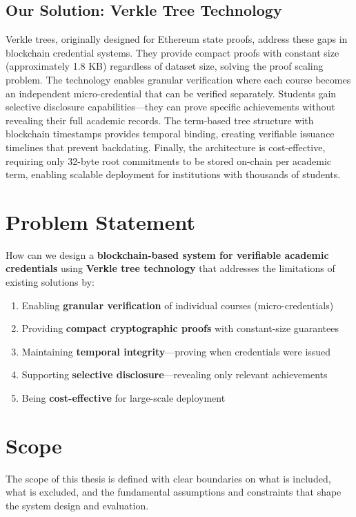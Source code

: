 \subsection{Our Solution: Verkle Tree Technology}
Verkle trees, originally designed for Ethereum state proofs, address these gaps in blockchain credential systems. They provide compact proofs with constant size (approximately 1.8 KB) regardless of dataset size, solving the proof scaling problem. The technology enables granular verification where each course becomes an independent micro-credential that can be verified separately. Students gain selective disclosure capabilities—they can prove specific achievements without revealing their full academic records. The term-based tree structure with blockchain timestamps provides temporal binding, creating verifiable issuance timelines that prevent backdating. Finally, the architecture is cost-effective, requiring only 32-byte root commitments to be stored on-chain per academic term, enabling scalable deployment for institutions with thousands of students.

\section{Problem Statement}
How can we design a \textbf{blockchain-based system for verifiable academic credentials} using \textbf{Verkle tree technology} that addresses the limitations of existing solutions by:

\begin{enumerate}
    \item Enabling \textbf{granular verification} of individual courses (micro-credentials)
    \item Providing \textbf{compact cryptographic proofs} with constant-size guarantees
    \item Maintaining \textbf{temporal integrity}—proving when credentials were issued
    \item Supporting \textbf{selective disclosure}—revealing only relevant achievements
    \item Being \textbf{cost-effective} for large-scale deployment
\end{enumerate}

\section{Scope}
The scope of this thesis is defined with clear boundaries on what is included, what is excluded, and the fundamental assumptions and constraints that shape the system design and evaluation.

